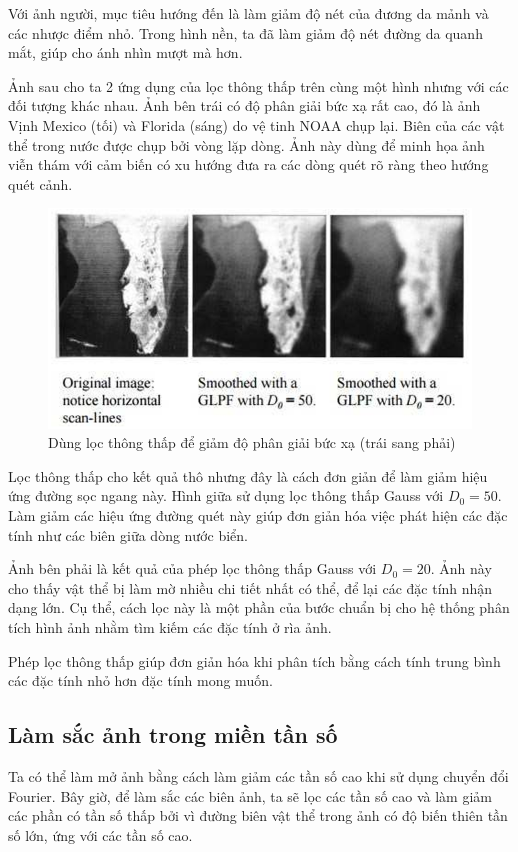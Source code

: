 \documentclass[12pt,a4paper]{report}
\numberwithin{equation}{section}
\theoremstyle{definition} %
\begin{document}
Với ảnh người, mục tiêu hướng đến là làm giảm độ nét của đương da mảnh và các nhược điểm nhỏ. Trong hình nền, ta đã làm giảm độ nét đường da quanh mắt, giúp cho ánh nhìn mượt mà hơn.

Ảnh sau cho ta 2 ứng dụng của lọc thông thấp trên cùng một hình nhưng với các đối tượng khác nhau. Ảnh bên trái có độ phân giải bức xạ rất cao, đó là ảnh Vịnh Mexico (tối) và Florida (sáng) do vệ tinh NOAA chụp lại. Biên của các vật thể trong nước được chụp bởi vòng lặp dòng. Ảnh này dùng để minh họa ảnh viễn thám với cảm biến có xu hướng đưa ra các dòng quét rõ ràng theo hướng quét cảnh.

\begin{figure}[H]
\centering
\includegraphics[width=0.88\linewidth]{img/ungdungmoanh3.png}
\caption{Dùng lọc thông thấp để giảm độ phân giải bức xạ (trái sang phải)}
\end{figure}

Lọc thông thấp cho kết quả thô nhưng đây là cách đơn giản để làm giảm hiệu ứng đường sọc ngang này. Hình giữa sử dụng lọc thông thấp Gauss với $D_0=50$. Làm giảm các hiệu ứng đường quét này giúp đơn giản hóa việc phát hiện các đặc tính như các biên giữa dòng nước biển.

Ảnh bên phải là kết quả của phép lọc thông thấp Gauss với $D_0=20$. Ảnh này cho thấy vật thể bị làm mờ nhiều chi tiết nhất có thể, để lại các đặc tính nhận dạng lớn. Cụ thể, cách lọc này là một phần của bước chuẩn bị cho hệ thống phân tích hình ảnh nhằm tìm kiếm các đặc tính ở rìa ảnh.

Phép lọc thông thấp giúp đơn giản hóa khi phân tích bằng cách tính trung bình các đặc tính nhỏ hơn đặc tính mong muốn.
\subsection{Làm sắc ảnh trong miền tần số}

Ta có thể làm mở ảnh bằng cách làm giảm các tần số cao khi sử dụng chuyển đổi Fourier. Bây giờ, để làm sắc các biên ảnh, ta sẽ lọc các tần số cao và làm giảm các phần có tần số thấp bởi vì đường biên vật thể trong ảnh có độ biến thiên tần số lớn, ứng với các tần số cao.
\end{document}

